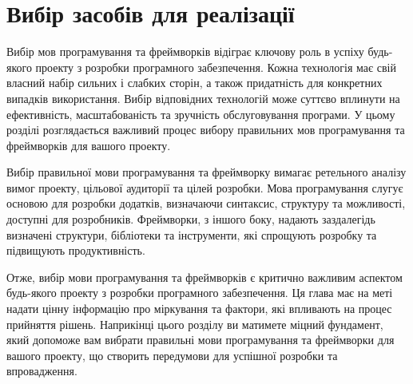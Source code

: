 \chapter{Вибір засобів для реалізації}
\label{chap:implementation-methods}

Вибір мов програмування та фреймворків відіграє ключову роль в успіху будь-якого проекту з розробки програмного забезпечення. Кожна технологія має свій власний набір сильних і слабких сторін, а також придатність для конкретних випадків використання. Вибір відповідних технологій може суттєво вплинути на ефективність, масштабованість та зручність обслуговування програми. У цьому розділі розглядається важливий процес вибору правильних мов програмування та фреймворків для вашого проекту.

Вибір правильної мови програмування та фреймворку вимагає ретельного аналізу вимог проекту, цільової аудиторії та цілей розробки. Мова програмування слугує основою для розробки додатків, визначаючи синтаксис, структуру та можливості, доступні для розробників. Фреймворки, з іншого боку, надають заздалегідь визначені структури, бібліотеки та інструменти, які спрощують розробку та підвищують продуктивність.

Отже, вибір мови програмування та фреймворків є критично важливим аспектом будь-якого проекту з розробки програмного забезпечення. Ця глава має на меті надати цінну інформацію про міркування та фактори, які впливають на процес прийняття рішень. Наприкінці цього розділу ви матимете міцний фундамент, який допоможе вам вибрати правильні мови програмування та фреймворки для вашого проекту, що створить передумови для успішної розробки та впровадження.





